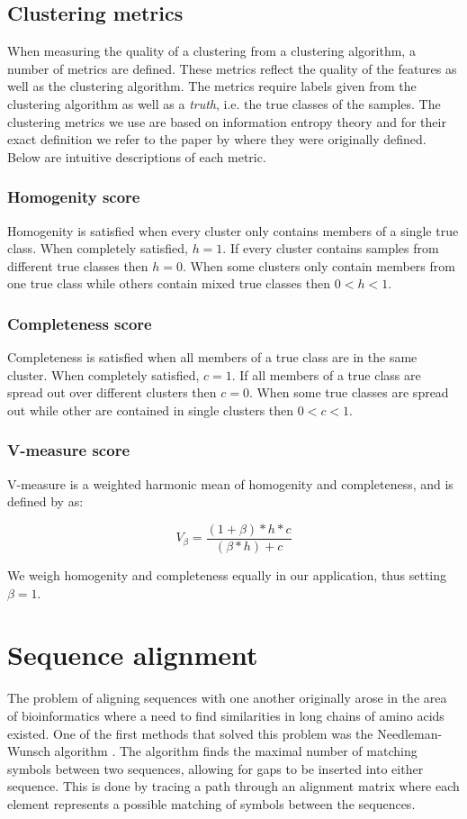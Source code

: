 \documentclass[a4paper]{report}
\begin{document}
\subsection{Clustering metrics}
\label{sec:metrics}
When measuring the quality of a clustering from a clustering algorithm, a
number of metrics are defined. These metrics reflect the quality of the
features as well as the clustering algorithm. The metrics require labels
given from the clustering algorithm as well as a \emph{truth}, i.e. the true
classes of the samples. The clustering metrics we use are based on information
entropy theory and for their exact definition we refer to the paper by
\citet{rosenberg07} where they were originally defined. Below are intuitive
descriptions of each metric.

\subsubsection{Homogenity score}
Homogenity is satisfied when every cluster only contains members of a single
true class. When completely satisfied, $h = 1$. If every cluster contains
samples from different true classes then $h = 0$. When some clusters only
contain members from one true class while others contain mixed true classes
then $0 < h < 1$.

\subsubsection{Completeness score}
Completeness is satisfied when all members of a true class are in the same
cluster. When completely satisfied, $c = 1$. If all members of a true class
are spread out over different clusters then $c = 0$. When some true classes
are spread out while other are contained in single clusters then
$0 < c < 1$.

\subsubsection{V-measure score}
V-measure is a weighted harmonic mean of homogenity and completeness, and
is defined by \citeauthor{rosenberg07} as:

\[
    V_{\beta} = \frac{(1 + \beta) * h * c}{(\beta * h) + c}
\]

We weigh homogenity and completeness equally in our application, thus setting
$\beta = 1$.

\section{Sequence alignment}
The problem of aligning sequences with one another originally arose in the area
of bioinformatics where a need to find similarities in long chains of amino
acids existed. One of the first methods that solved this problem was the
Needleman-Wunsch algorithm \citep{needleman70}. The algorithm finds the maximal
number of matching symbols between two sequences, allowing for gaps to be
inserted into either sequence. This is done by tracing a path through an
alignment matrix where each element represents a possible matching of symbols
between the sequences.
\end{document}
